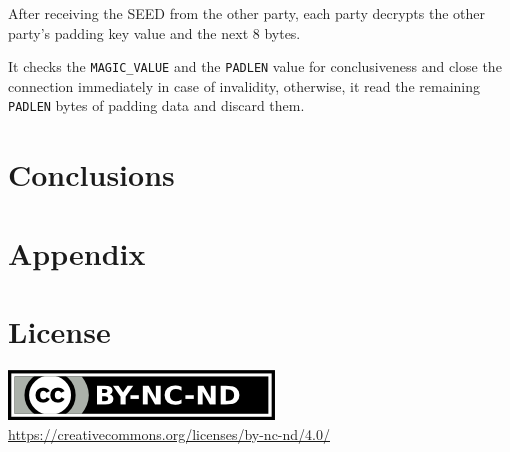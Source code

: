 \documentclass[sigconf, screen]{acmart}
\begin{document}
After receiving the SEED from the other party, each party decrypts the other party's padding key value and the next 8 bytes.

It checks the \lstinline[language=C]{MAGIC_VALUE} and the \lstinline[language=C]{PADLEN} value for conclusiveness and close the connection immediately in case of invalidity, otherwise, it read the remaining \lstinline[language=C]{PADLEN} bytes of padding data and discard them.
\section{Conclusions}
\label{s:conclusions}
\appendix
\section{Appendix}
\label{s:appendix}


\section*{License}
\label{s:license}
\begin{center}
	\includegraphics{by-nc-nd.png} \\
	\url{https://creativecommons.org/licenses/by-nc-nd/4.0/}
\end{center}
\end{document}
